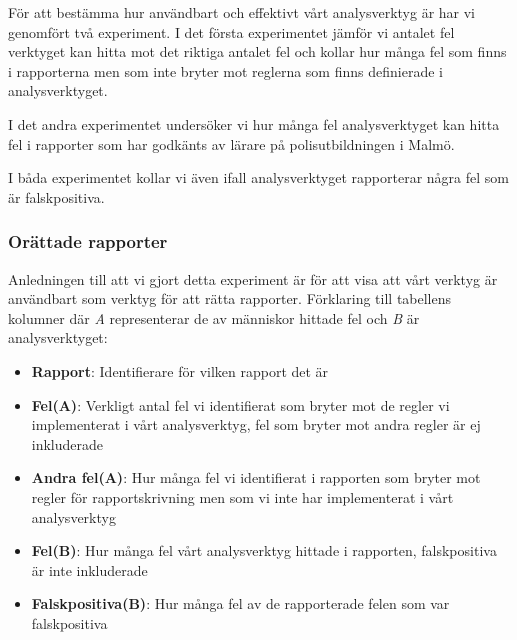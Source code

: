 \documentclass[swedish]{maucsthesis}
\begin{document}
För att bestämma hur användbart och effektivt vårt analysverktyg är har vi genomfört två experiment.
I det första experimentet jämför vi antalet fel verktyget kan hitta mot det riktiga
antalet fel och kollar hur många fel som finns i rapporterna men som inte bryter mot
reglerna som finns definierade i analysverktyget. 

I det andra experimentet undersöker vi hur många fel analysverktyget kan hitta fel i rapporter
som har godkänts av lärare på polisutbildningen i Malmö.

I båda experimentet kollar vi även ifall analysverktyget rapporterar några fel som är
falskpositiva.

\subsubsection{Orättade rapporter}

Anledningen till att vi gjort detta experiment är för att visa att vårt verktyg är användbart som verktyg för att rätta rapporter.
Förklaring till tabellens kolumner där \textit{A} representerar de av människor hittade fel och \textit{B} är analysverktyget:

\begin{itemize}
\item \textbf{Rapport}: Identifierare för vilken rapport det är
\item \textbf{Fel(A)}: Verkligt antal fel vi identifierat som bryter mot de regler vi implementerat i vårt analysverktyg, fel som bryter mot andra regler är ej inkluderade
\item \textbf{Andra fel(A)}: Hur många fel vi identifierat i rapporten som bryter mot regler för rapportskrivning men som vi inte har implementerat i vårt analysverktyg
\item \textbf{Fel(B)}: Hur många fel vårt analysverktyg hittade i rapporten, falskpositiva är inte inkluderade
\item \textbf{Falskpositiva(B)}: Hur många fel av de rapporterade felen som var falskpositiva
\end{itemize}
\end{document}
